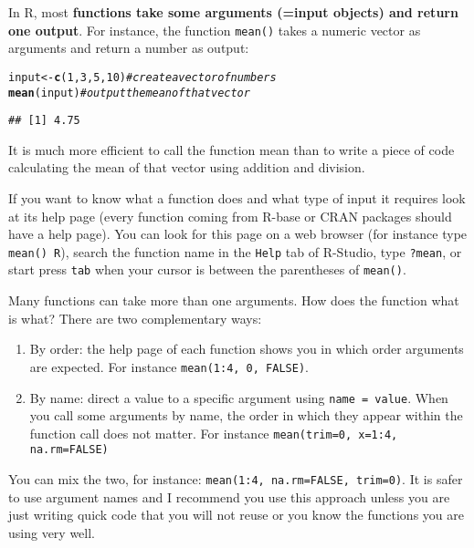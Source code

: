 \documentclass[12pt,a4paper]{scrartcl}\usepackage[]{graphicx}\usepackage[]{color}
\makeatletter
\newcommand{\hlnum}[1]{\textcolor[rgb]{0.686,0.059,0.569}{#1}}%
\newcommand{\hlcom}[1]{\textcolor[rgb]{0.678,0.584,0.686}{\textit{#1}}}%
\newcommand{\hlstd}[1]{\textcolor[rgb]{0.345,0.345,0.345}{#1}}%
\newcommand{\hlkwb}[1]{\textcolor[rgb]{0.69,0.353,0.396}{#1}}%
\newcommand{\hlkwd}[1]{\textcolor[rgb]{0.737,0.353,0.396}{\textbf{#1}}}%
\newenvironment{kframe}{%
 \def\at@end@of@kframe{}%
 \ifinner\ifhmode%
  \def\at@end@of@kframe{\end{minipage}}%
  \begin{minipage}{\columnwidth}%
 \fi\fi%
 \def\FrameCommand##1{\hskip\@totalleftmargin \hskip-\fboxsep
 \colorbox{shadecolor}{##1}\hskip-\fboxsep
     \hskip-\linewidth \hskip-\@totalleftmargin \hskip\columnwidth}%
 \MakeFramed {\advance\hsize-\width
   \@totalleftmargin\z@ \linewidth\hsize
   \@setminipage}}%
 {\par\unskip\endMakeFramed%
 \at@end@of@kframe}
\newenvironment{knitrout}{}{} %
\makeatother
\begin{document}
In R, most \textbf{functions take some arguments (=input objects) and return one output}.
For instance, the function \texttt{mean()} takes a numeric vector as arguments and return a number as output:
\begin{knitrout}
\color{fgcolor}\begin{kframe}
\begin{alltt}
\hlstd{input} \hlkwb{<-} \hlkwd{c}\hlstd{(}\hlnum{1}\hlstd{,}\hlnum{3}\hlstd{,}\hlnum{5}\hlstd{,}\hlnum{10}\hlstd{)} \hlcom{# create a vector of numbers}
\hlkwd{mean}\hlstd{(input)} \hlcom{# output the mean of that vector}
\end{alltt}
\begin{verbatim}
## [1] 4.75
\end{verbatim}
\end{kframe}
\end{knitrout}
It is much more efficient to call the function mean than to write a piece of code calculating the mean of that vector using addition and division.

If you want to know what a function does and what type of input it requires look at its help page (every function coming from R-base or CRAN packages should have a help page). You can look for this page on a web browser (for instance type \texttt{mean() R}), search the function name in the \texttt{Help} tab of R-Studio, type \texttt{?mean}, or start press \texttt{tab} when your cursor is between the parentheses of \texttt{mean()}.

Many functions can take more than one arguments. How does the function what is what? There are two complementary ways:
\begin{enumerate}
\item By order: the help page of each function shows you in which order arguments are expected. For instance \texttt{mean(1:4, 0, FALSE)}.
\item By name: direct a value to a specific argument using \texttt{name = value}. When you call some arguments by name, the order in which they appear within the function call does not matter. For instance \texttt{mean(trim=0, x=1:4, na.rm=FALSE)}
\end{enumerate}
You can mix the two, for instance: \texttt{mean(1:4, na.rm=FALSE, trim=0)}.
It is safer to use argument names and I recommend you use this approach unless you are just writing quick code that you will not reuse or you know the functions you are using very well.
\end{document}
